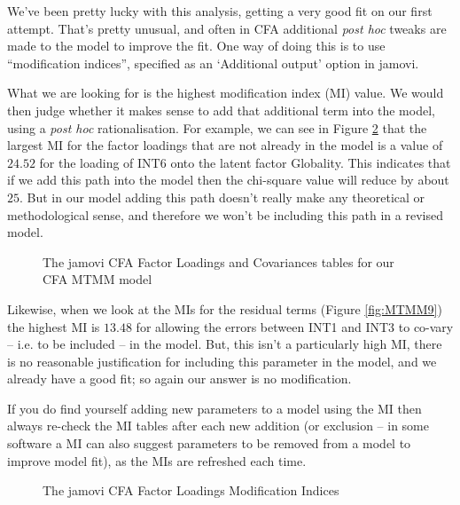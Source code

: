 We’ve been pretty lucky with this analysis, getting a very good fit on our first attempt. That’s pretty unusual, and often in CFA additional {\it post hoc} tweaks are made to the model to improve the fit. One way of doing this is to use “modification indices”, specified as an ‘Additional output’ option in jamovi.


What we are looking for is the highest modification index (MI) value. We would then judge whether it makes sense to add that additional term into the model, using a {\it post hoc} rationalisation. For example, we can see in Figure \ref{fig:MTMM8} that the largest MI for the factor loadings that are not already in the model is a value of $24.52$ for the loading of INT6 onto the latent factor Globality. This indicates that if we add this path into the model then the chi-square value will reduce by about $25$. But in our model adding this path doesn't really make any theoretical or methodological sense, and therefore we won’t be including this path in a revised model.

\begin{figure}[!htb]
\begin{center}
\caption{The jamovi CFA Factor Loadings and Covariances tables for our CFA MTMM model}
\label{fig:MTMM7}
\HR
\end{center}
\end{figure}

Likewise, when we look at the MIs for the residual terms (Figure \ref{fig:MTMM9}) the highest MI is $13.48$ for allowing the errors between INT1 and INT3 to co-vary – i.e. to be included – in the model. But, this isn’t a particularly high MI, there is no reasonable justification for including this parameter in the model, and we already have a good fit; so again our answer is no modification.

If you do find yourself adding new parameters to a model using the MI then always re-check the MI tables after each new addition (or exclusion – in some software a MI can also suggest parameters to be removed from a model to improve model fit), as the MIs are refreshed each time.

\begin{figure}[!htb]
\begin{center}
\caption{The jamovi CFA Factor Loadings Modification Indices}
\label{fig:MTMM8}
\HR
\end{center}
\end{figure}

